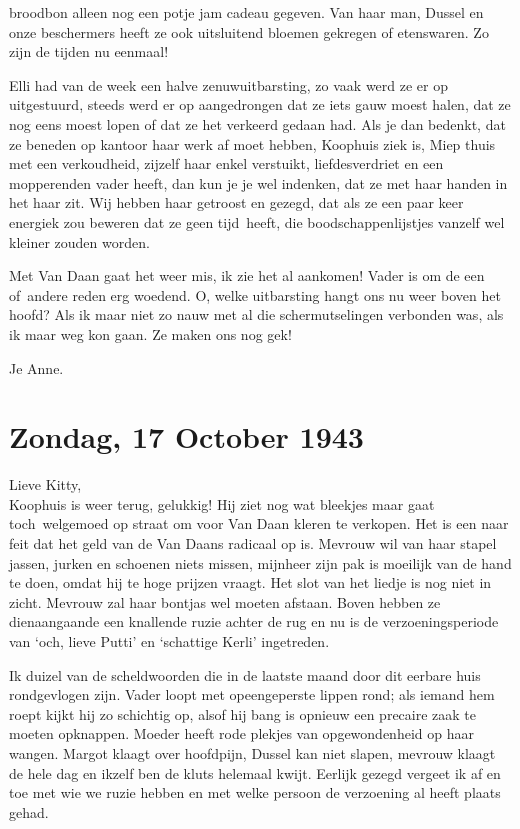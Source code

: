 \documentclass{book}
\begin{document}
broodbon alleen nog een potje jam cadeau gegeven. Van haar man, Dussel
en onze beschermers heeft ze ook uitsluitend bloemen gekregen of
etenswaren. Zo zijn de tijden nu eenmaal!

Elli had van de week een halve zenuwuitbarsting, zo vaak werd ze er op
uitgestuurd, steeds werd er op aangedrongen dat ze iets gauw moest
halen, dat ze nog eens moest lopen of dat ze het verkeerd gedaan had.
Als je dan bedenkt, dat ze beneden op kantoor haar werk af moet hebben,
Koophuis ziek is, Miep thuis met een verkoudheid, zijzelf haar enkel
verstuikt, liefdesverdriet en een mopperenden vader heeft, dan kun je je
wel indenken, dat ze met haar handen in het haar zit. Wij hebben haar
getroost en gezegd, dat als ze een paar keer energiek zou beweren dat ze
geen tijd~heeft, die boodschappenlijstjes vanzelf wel kleiner zouden
worden.

Met Van Daan gaat het weer mis, ik zie het al aankomen! Vader is om de
een of~andere reden erg woedend. O, welke uitbarsting hangt ons nu weer
boven het hoofd? Als ik maar niet zo nauw met al die schermutselingen
verbonden was, als ik maar weg kon gaan. Ze maken ons nog gek!

Je Anne.

\chapter{Zondag, 17 October 1943}

Lieve Kitty,\\Koophuis is weer terug, gelukkig! Hij ziet nog wat
bleekjes maar gaat toch~welgemoed op straat om voor Van Daan kleren te
verkopen. Het is een naar feit dat het geld van de Van Daans radicaal op
is. Mevrouw wil van haar stapel jassen, jurken en schoenen niets missen,
mijnheer zijn pak is moeilijk van de hand te doen, omdat hij te hoge
prijzen vraagt. Het slot van het liedje is nog niet in zicht. Mevrouw
zal haar bontjas wel moeten afstaan. Boven hebben ze dienaangaande een
knallende ruzie achter de rug en nu is de verzoeningsperiode van `och,
lieve Putti' en `schattige Kerli' ingetreden.

Ik duizel van de scheldwoorden die in de laatste maand door dit eerbare
huis rondgevlogen zijn. Vader loopt met opeengeperste lippen rond; als
iemand hem roept kijkt hij zo schichtig op, alsof hij bang is opnieuw
een precaire zaak te moeten opknappen. Moeder heeft rode plekjes van
opgewondenheid op haar wangen. Margot klaagt over hoofdpijn, Dussel kan
niet slapen, mevrouw klaagt de hele dag en ikzelf ben de kluts helemaal
kwijt. Eerlijk gezegd vergeet ik af en toe met wie we ruzie hebben en
met welke persoon de verzoening al heeft plaats gehad.
\end{document}
